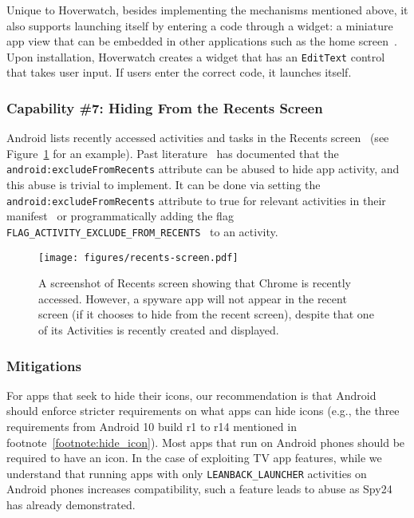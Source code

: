 Unique to Hoverwatch, besides implementing the mechanisms mentioned above, it also supports launching itself by entering a
code through a widget: a miniature app view that can be embedded in other
applications such as the home screen~\cite{Appwidge49:online}. Upon installation,
Hoverwatch creates a widget that has an \texttt{EditText} control that takes user input. If users
enter the correct code, it launches itself.



\subsubsection*{Capability \#7: Hiding From the Recents Screen}

Android lists recently accessed activities and tasks in the Recents
screen~\cite{Recentss9:online} (see Figure~\ref{fig:recents_screen} for an
example). Past literature~\cite{shan2018self, zhou2020demystifying} has
documented that the \texttt{android:excludeFromRecents} attribute can be abused
to hide app activity, and this abuse is trivial to implement. It can be done via
setting the \texttt{android:excludeFromRecents} attribute to true for relevant
activities in their manifest~\cite{activity72:online} or programmatically adding
the flag
\texttt{FLAG\_ACTIVITY\_EXCLUDE\_FROM\_RECENTS}~\cite{IntentAn90:online} to an
activity.

\begin{figure}[t]
\centering
\texttt{[image: figures/recents-screen.pdf]}
\caption{A screenshot of Recents screen showing that Chrome is recently accessed. However, a spyware app will not appear in the recent screen (if it chooses to hide from the recent screen), despite that one of its Activities is recently created and displayed.}
\label{fig:recents_screen}
\end{figure}


\subsubsection{Mitigations}
For apps that seek to hide their icons, our recommendation is that Android should enforce stricter requirements on what apps can hide icons (e.g., the three requirements from Android 10 build r1 to r14 mentioned in footnote~\ref{footnote:hide_icon}).
Most apps that run on Android phones should be required to have an icon. In the case of exploiting TV app features, while we
understand that running apps with only \texttt{LEANBACK\_LAUNCHER} activities on
Android phones increases compatibility, such a feature leads to abuse as Spy24
has already demonstrated.

